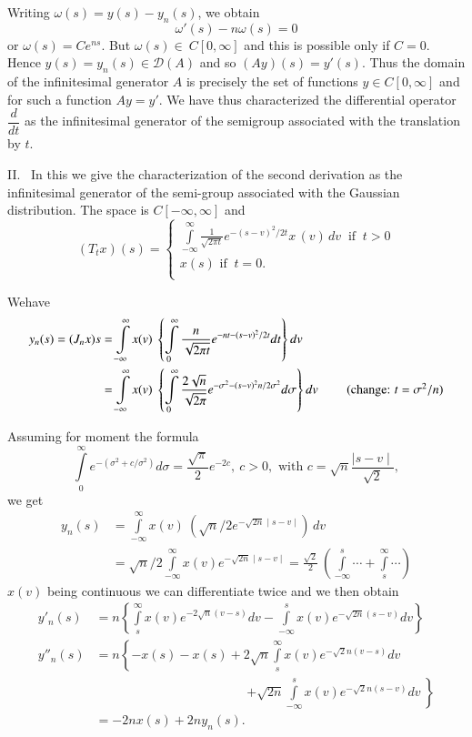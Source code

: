 Writing $ \omega (s) = y(s) -y_n (s)$, we obtain
$$
\omega' (s) -n \omega (s) = 0 
$$ 
or $ \omega (s) = C e^{ns} $. But $ \omega (s) \in ~ C [ 0,
 \infty ] $ and this is possible only if $ C = 0 $. Hence $ y
(s) = y_n (s) \in \mathscr{D} (A) $ and so $ (Ay) (s) = y' (s) $. Thus
the domain of the infinitesimal generator $A$ is precisely the set of
functions $ y \in C [ 0, \infty ] $ and for such a function
$ Ay = y' $. We have thus characterized the differential operator $
\dfrac{d}{dt} $ as the infinitesimal generator of the semigroup
associated with the translation by $t$. 

II.~ In this we give the characterization of the second derivation as
 the infinitesimal generator of the semi-group associated with the
 Gaussian distribution. The space is $ C[-\infty, \infty ] $
 and 
 $$
 ( T_t x ) (s) =
 \begin{cases}
  \int \limits^{\infty}_{- \infty} \frac{1}{\sqrt{2 \pi t} }
  e^{-(s-v)^2/2t} x \,(v)\, dv ~\text{ if } ~ t > 0 \\ 
  x (s) \text{ if } ~ t = 0. \\
 \end{cases}
 $$ 

We\pageoriginale have
\begin{align*}
 y_n (s) = (J_n x) s &= \int \limits^{\infty}_{-\infty} x(v) ~ \left\{
 \int \limits^{\infty}_{0} \frac{n}{\sqrt{2 \pi t}} e^{-nt - (s-v)^2
  /2t} dt \right\} dv \\ 
 &= \int \limits^{\infty}_{-\infty} x(v) ~ \left\{ \int
 \limits^{\infty}_{0} \frac{2 \sqrt{n}}{\sqrt{2 \pi }} e^{-\sigma^2
  - (s-v)^2 n/2 \sigma^2} d \sigma \right\} dv ~\tag*{(\text{change}: $t =
 \sigma^2 / n$)}
 \end{align*} 
 
 Assuming for moment the formula 
 $$
 \int \limits^{\infty}_{0} e^{-(\sigma^2 + c/ \sigma^2)} d \sigma =
 \frac{\sqrt{\pi}}{2} e^{-2 c}, ~ c > 0, \text{ with } c = \sqrt{n}
 \frac{\mid s -v \mid}{\sqrt{2}}, 
 $$
 we get 
 \begin{align*}
  y_n (s) &= \int \limits^{\infty}_{-\infty} x(v) ~ \left( \sqrt{n}/2
  e^{-\sqrt{2 n} \mid s-v \mid}\right)\, dv \\ 
  &= \sqrt{n}/2 \int \limits^{\infty}_{-\infty} x(v) e^{-\sqrt{2 n}
   \mid s-v \mid} = \frac{\sqrt{2}}{2}~ \left(\int \limits^{s}_{-\infty}
  \cdots + \int \limits^{\infty}_{s} \cdots \right) 
 \end{align*} 
 $x (v)$ being continuous we can differentiate twice and we then obtain 
 \begin{align*}
  y'_n (s) &= n \left \{ \int \limits^{\infty}_{s} x (v) e^{-2
   \sqrt{n} (v-s)} dv - \int \limits^{s}_{-\infty} x (v) e^{-
   \sqrt{2 n} (s -v)} dv \right\} \\ 
  y''_n (s) &= n \left \{ -x (s) -x (s) + 2 \sqrt{n} \int
  \limits^{\infty}_{s} x (v) e^{-\sqrt{2}n (v-s)} dv\right.\\ 
  & \hspace{5cm} \left.+ \sqrt{2 n}
  \int \limits^{s}_{-\infty} x (v) e^{- \sqrt{2}n (s-v)} dv ~ \right
  \} \\ 
  &= -2n x (s) + 2n y_n (s).
 \end{align*} 
 
